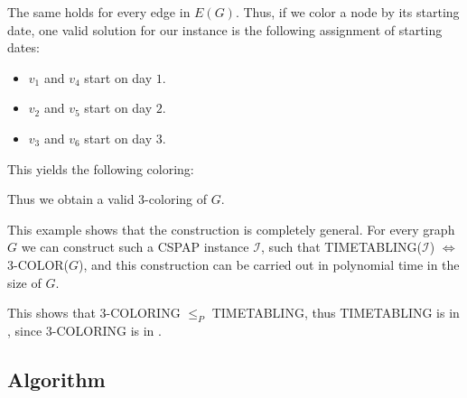 The same holds for every edge in $E(G)$. Thus, if we color a node by its starting date, one valid solution for our instance is the following assignment of starting dates:

\begin{itemize}
\item $v_1$ and $v_4$ start on day $1$.
\item $v_2$ and $v_5$ start on day $2$.
\item $v_3$ and $v_6$ start on day $3$.
\end{itemize}

This yields the following coloring:

\begin{center}
\end{center}

Thus we obtain a valid 3-coloring of $G$.

This example shows that the construction is completely general. For every graph $G$ we can construct such a CSPAP instance $\mathcal{I}$, such that TIMETABLING($\mathcal{I}$) $\iff$ 3-COLOR($G$), and this construction can be carried out in polynomial time in the size of $G$.

This shows that 3-COLORING $\le_P$ TIMETABLING, thus TIMETABLING is in \nph, since 3-COLORING is in \nph.

\newpage

\subsection{Algorithm}


